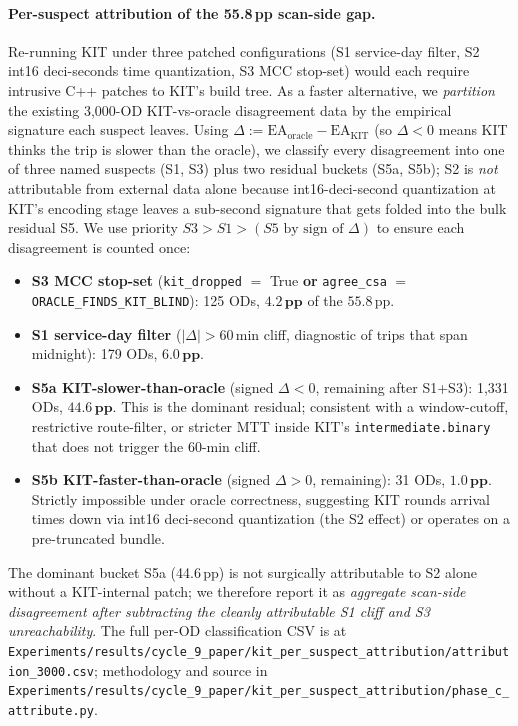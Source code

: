 \documentclass[letterpaper]{article}
\begin{document}
\paragraph{Per-suspect attribution of the 55.8\,pp scan-side gap.}
Re-running KIT under three patched configurations (S1 service-day
filter, S2 int16 deci-seconds time quantization, S3 MCC stop-set)
would each require intrusive C++ patches to KIT's build tree. As a
faster alternative, we \emph{partition} the existing 3{,}000-OD
KIT-vs-oracle disagreement data by the empirical signature each
suspect leaves. Using
$\Delta \!:=\! \text{EA}_\text{oracle}\!-\!\text{EA}_\text{KIT}$
(so $\Delta\!<\!0$ means KIT thinks the trip is slower than the
oracle), we classify every disagreement into one of three named
suspects (S1, S3) plus two residual buckets (S5a, S5b); S2 is
\emph{not} attributable from external data alone because int16-deci-second
quantization at KIT's encoding stage leaves a sub-second signature
that gets folded into the bulk residual S5. We use priority
$S3>S1>(S5\text{ by sign of }\Delta)$ to ensure each disagreement
is counted once:
\begin{itemize}
\item \textbf{S3 MCC stop-set} (\texttt{kit\_dropped} $=$ True \textbf{or}
\texttt{agree\_csa} $=$ \texttt{ORACLE\_FINDS\_KIT\_BLIND}): 125 ODs,
$\mathbf{4.2\,\text{pp}}$ of the $55.8$\,pp.
\item \textbf{S1 service-day filter} ($|\Delta|\!>\!60$\,min cliff,
diagnostic of trips that span midnight): 179 ODs, $\mathbf{6.0\,\text{pp}}$.
\item \textbf{S5a KIT-slower-than-oracle} (signed $\Delta\!<\!0$,
remaining after S1+S3): 1{,}331 ODs, $\mathbf{44.6\,\text{pp}}$.
This is the dominant residual; consistent with a window-cutoff,
restrictive route-filter, or stricter MTT inside KIT's
\texttt{intermediate.binary} that does not trigger the 60-min cliff.
\item \textbf{S5b KIT-faster-than-oracle} (signed $\Delta\!>\!0$,
remaining): 31 ODs, $\mathbf{1.0\,\text{pp}}$. Strictly impossible
under oracle correctness, suggesting KIT rounds arrival times down
via int16 deci-second quantization (the S2 effect) or operates on a
pre-truncated bundle.
\end{itemize}
The dominant bucket S5a (44.6\,pp) is not surgically attributable to
S2 alone without a KIT-internal patch; we therefore report it as
\emph{aggregate scan-side disagreement after subtracting the cleanly
attributable S1 cliff and S3 unreachability}. The full per-OD
classification CSV is at
\texttt{Experiments/results/cycle\_9\_paper/kit\_per\_suspect\_attribution/}\allowbreak\texttt{attribution\_3000.csv};
methodology and source in
\texttt{Experiments/results/cycle\_9\_paper/kit\_per\_suspect\_attribution/}\allowbreak\texttt{phase\_c\_attribute.py}.
\end{document}
